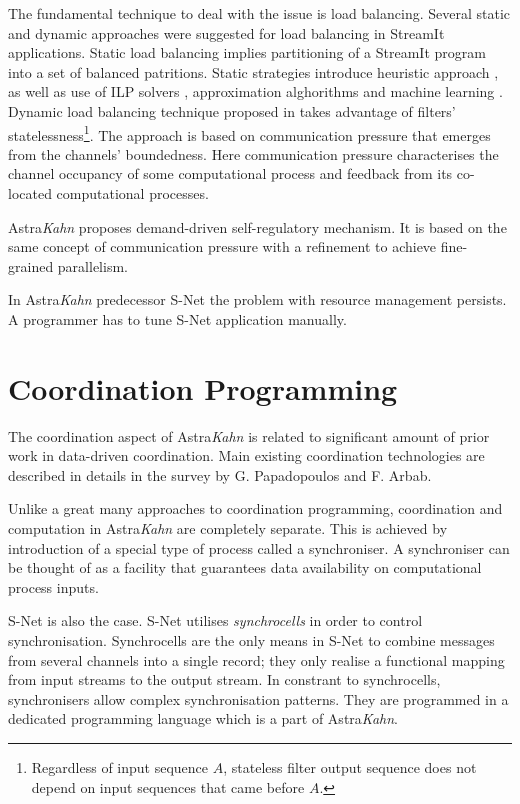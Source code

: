 The fundamental technique to deal with the issue is load balancing. Several static and dynamic approaches were suggested for load balancing in StreamIt applications. Static load balancing implies partitioning of a StreamIt program into a set of balanced patritions. Static strategies introduce heuristic approach \cite{streamit}, as well as use of ILP solvers \cite{kudlur}, approximation alghorithms \cite{farhad} and machine learning \cite{wang}. Dynamic load balancing technique proposed in \cite{collins} takes advantage of filters' statelessness\footnote{Regardless of input sequence $A$, stateless filter output sequence does not depend on input sequences that came before $A$.}. The approach is based on communication pressure that emerges from the channels' boundedness. Here communication pressure characterises the channel occupancy of some computational process and feedback from its co-located computational processes.

Astra\emph{Kahn} proposes demand-driven self-regulatory mechanism. It is based on the same concept of communication pressure with a refinement to achieve fine-grained parallelism.

In Astra\emph{Kahn} predecessor S-Net \cite{snet_intro} the problem with resource management persists. A programmer has to tune S-Net application manually.


    \section{Coordination Programming}
The coordination aspect of Astra\emph{Kahn} is related to significant amount of prior work in data-driven coordination. Main existing coordination technologies are described in details in the survey \cite{papadopoulos} by G. Papadopoulos and F. Arbab.

Unlike a great many approaches to coordination programming, coordination and computation in Astra\emph{Kahn} are completely separate. This is achieved by introduction of a special type of process called a synchroniser. A synchroniser can be thought of as a facility that guarantees data availability on computational process inputs.

S-Net is also the case. S-Net utilises \emph{synchrocells} in order to control synchronisation. Synchrocells are the only means in S-Net to combine messages from several channels into a single record; they only realise a functional mapping from input streams to the output stream. In constrant to synchrocells, synchronisers allow complex synchronisation patterns. They are programmed in a dedicated programming language which is a part of Astra\emph{Kahn}.

